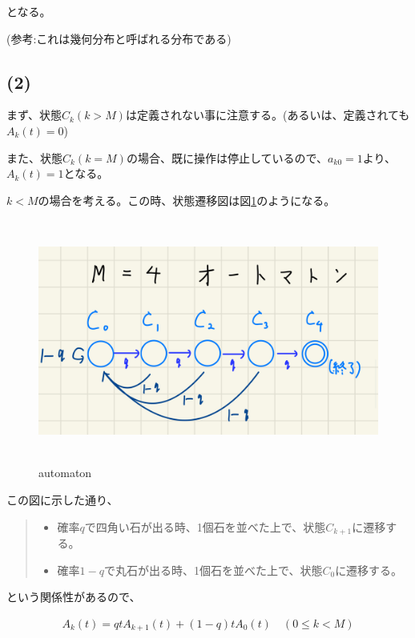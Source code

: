\documentclass[a4paper, 10pt, dvipdfmx]{jlreq}
\begin{document}
となる。

(参考:これは幾何分布と呼ばれる分布である\cite{site:geo})

\subsection*{(2)}

まず、状態$C_k(k>M)$は定義されない事に注意する。(あるいは、定義されても$A_k(t)=0$)

また、状態$C_k(k=M)$の場合、既に操作は停止しているので、$a_{k0}=1$より、$A_k(t)=1$となる。

$k<M$の場合を考える。この時、状態遷移図は図\ref{img:automaton}のようになる。

\begin{figure}[htbp]
    \begin{center}
        \includegraphics[height=80mm]{automaton.png}
        \caption{automaton}
        \label{img:automaton}
    \end{center}
\end{figure}

この図に示した通り、

\begin{quote}
    \begin{itemize}
        \item 確率$q$で四角い石が出る時、1個石を並べた上で、状態$C_{k+1}$に遷移する。
        \item 確率$1-q$で丸石が出る時、1個石を並べた上で、状態$C_0$に遷移する。
    \end{itemize}
\end{quote}

という関係性があるので、

\begin{align*}
    A_k(t)=qtA_{k+1}(t)+(1-q)tA_0(t) \quad (0 \leq k < M)
\end{align*}
\end{document}
